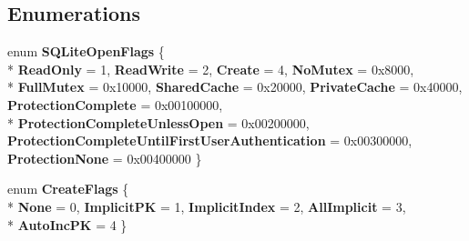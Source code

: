 \subsection*{Enumerations}
\begin{DoxyCompactItemize}
\item 
\hypertarget{namespaceSQLite_a9d72cc097c53dbc96a6f0eec530cc439}{}enum {\bfseries S\+Q\+Lite\+Open\+Flags} \{ \\*
{\bfseries Read\+Only} = 1, 
{\bfseries Read\+Write} = 2, 
{\bfseries Create} = 4, 
{\bfseries No\+Mutex} = 0x8000, 
\\*
{\bfseries Full\+Mutex} = 0x10000, 
{\bfseries Shared\+Cache} = 0x20000, 
{\bfseries Private\+Cache} = 0x40000, 
{\bfseries Protection\+Complete} = 0x00100000, 
\\*
{\bfseries Protection\+Complete\+Unless\+Open} = 0x00200000, 
{\bfseries Protection\+Complete\+Until\+First\+User\+Authentication} = 0x00300000, 
{\bfseries Protection\+None} = 0x00400000
 \}\label{namespaceSQLite_a9d72cc097c53dbc96a6f0eec530cc439}

\item 
\hypertarget{namespaceSQLite_a5ada328810363319c85c3e0c28c67479}{}enum {\bfseries Create\+Flags} \{ \\*
{\bfseries None} = 0, 
{\bfseries Implicit\+P\+K} = 1, 
{\bfseries Implicit\+Index} = 2, 
{\bfseries All\+Implicit} = 3, 
\\*
{\bfseries Auto\+Inc\+P\+K} = 4
 \}\label{namespaceSQLite_a5ada328810363319c85c3e0c28c67479}

\end{DoxyCompactItemize}
